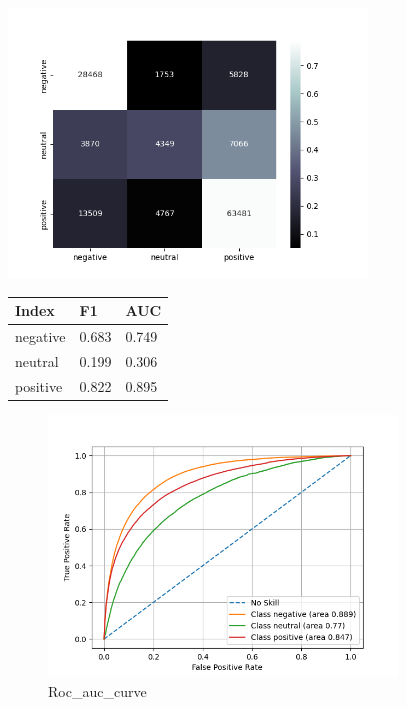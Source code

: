 \documentclass{article}%
\begin{document}
{\begin{minipage}[c]{0.95\textwidth}
\begin{minipage}{0.55\textwidth}
\end{minipage}%
\end{minipage}%
\linebreak%
\begin{minipage}{0.7\textwidth}%
\begin{minipage}{0.8\textwidth}%
\includegraphics[width=360px]{./report/Learning/Svm_Svc/confusion-matrix.png}%
\end{minipage}%
\begin{minipage}{0.5\textwidth}%
\begin{tabu}[t]{X[r] | X[r] X[r]}%
\hline%
\textbf{Index}&\textbf{F1}&\textbf{AUC}\\%
\hline%
negative&0.683&0.749\\%
neutral&0.199&0.306\\%
positive&0.822&0.895\\%
\end{tabu}%
\end{minipage}%
\end{minipage}%


\begin{figure}[h!]%
\centering%
\includegraphics[width=350px]{./report/Learning/Svm_Svc/True-Positive-Rate.png}%
\caption{Roc\_auc\_curve}%
\end{figure}

}
\end{document}
